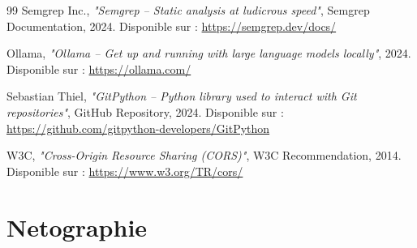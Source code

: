 \documentclass[12pt, a4paper, oneside]{report}
\begin{document}
\begin{thebibliography}{99}
    Semgrep Inc.,
    \textit{"Semgrep -- Static analysis at ludicrous speed"},
    Semgrep Documentation, 2024.
    Disponible sur : \url{https://semgrep.dev/docs/}

    Ollama,
    \textit{"Ollama -- Get up and running with large language models locally"},
    2024.
    Disponible sur : \url{https://ollama.com/}

    Sebastian Thiel,
    \textit{"GitPython -- Python library used to interact with Git repositories"},
    GitHub Repository, 2024.
    Disponible sur : \url{https://github.com/gitpython-developers/GitPython}

    W3C,
    \textit{"Cross-Origin Resource Sharing (CORS)"},
    W3C Recommendation, 2014.
    Disponible sur : \url{https://www.w3.org/TR/cors/}

\end{thebibliography}

\chapter*{Netographie}
\end{document}
